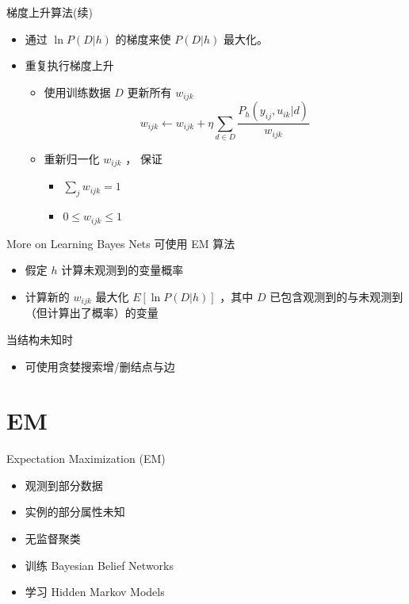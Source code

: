 \documentclass[presentation]{beamer}
\begin{document}
\begin{frame}[label={sec:org1c290c8}]{梯度上升算法(续)}
\begin{itemize}
\item 通过 \(\ln P(D|h)\) 的梯度来使 \(P(D|h)\) 最大化。
\item 重复执行梯度上升
\begin{itemize}
\item 使用训练数据 \(D\) 更新所有 \(w_{ijk}\) 
$$w_{ijk} \leftarrow w_{ijk} + \eta \sum_{d \in D} \frac{P_h(y_{ij}, u_{ik} |d)}{w_{ijk}}$$
\item 重新归一化 \(w_{ijk}\) ， 保证
\begin{itemize}
\item \(\sum_{j} w_{ijk} = 1\)
\item \(0 \leq w_{ijk} \leq 1\)
\end{itemize}
\end{itemize}
\end{itemize}
\end{frame}

\begin{frame}[label={sec:orgfefe543}]{More on Learning Bayes Nets}
可使用 EM 算法
\begin{itemize}
\item 假定 \(h\) 计算未观测到的变量概率
\item 计算新的 \(w_{ijk}\) 最大化 \(E[\ln P(D|h)]\) ，其中 \(D\) 已包含观测到的与未观测到（但计算出了概率）的变量
\end{itemize}

当结构未知时
\begin{itemize}
\item 可使用贪婪搜索增/删结点与边
\end{itemize}
\end{frame}

\section{EM}
\label{sec:orgcc3d60c}

\begin{frame}[label={sec:org4c99141}]{Expectation Maximization (EM)}
\begin{itemize}
\item 观测到部分数据
\item 实例的部分属性未知
\item 无监督聚类
\item 训练 Bayesian Belief Networks
\item 学习 Hidden Markov Models
\end{itemize}
\end{frame}
\end{document}
